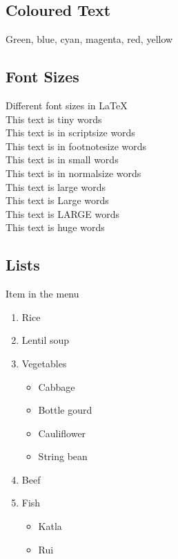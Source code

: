 \documentclass[a4paper,12pt]{article}
\begin{document}
\subsection{Coloured Text}
{\color{green}Green},
{\color{blue}blue},
{\color{cyan}cyan},
{\color{magenta}magenta},
{\color{red}red},
{\color{yellow}yellow}
\\
\subsection{Font Sizes}
Different font sizes in \LaTeX \\

{\tiny This text is tiny words} \\

{\scriptsize This text is in scriptsize words} \\

{\footnotesize This text is in footnotesize words} \\

{\small This text is in small words} \\

{\normalsize This text is in normalsize words} \\

{\large This text is large words} \\

{\Large This text is Large words} \\

{\LARGE This text is LARGE words} \\

{\huge This text is huge words}


\subsection{Lists}
Item in the menu
\begin{enumerate}
    \item Rice
    \item Lentil soup
    \item Vegetables
    \begin{itemize}
        \item Cabbage
        \item Bottle gourd
        \item Cauliflower
        \item String bean
    \end{itemize}
    \item Beef
    \item Fish
    \begin{itemize}
        \item Katla
        \item Rui
    \end{itemize}
\end{enumerate}
\end{document}
